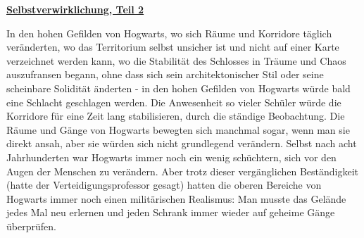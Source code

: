 

\hypertarget{selbstverwirklichung-teil-2}{%

\textbf{\uline{Selbstverwirklichung, Teil 2}}

In den hohen Gefilden von Hogwarts, wo sich Räume und Korridore täglich veränderten, wo das Territorium selbst unsicher ist und nicht auf einer Karte verzeichnet werden kann, wo die Stabilität des Schlosses in Träume und Chaos auszufransen begann, ohne dass sich sein architektonischer Stil oder seine scheinbare Solidität änderten - in den hohen Gefilden von Hogwarts würde bald eine Schlacht geschlagen werden. Die Anwesenheit so vieler Schüler würde die Korridore für eine Zeit lang stabilisieren, durch die ständige Beobachtung. Die Räume und Gänge von Hogwarts bewegten sich manchmal sogar, wenn man sie direkt ansah, aber sie würden sich nicht grundlegend verändern. Selbst nach acht Jahrhunderten war Hogwarts immer noch ein wenig schüchtern, sich vor den Augen der Menschen zu verändern. Aber trotz dieser vergänglichen Beständigkeit (hatte der Verteidigungsprofessor gesagt) hatten die oberen Bereiche von Hogwarts immer noch einen militärischen Realismus: Man musste das Gelände jedes Mal neu erlernen und jeden Schrank immer wieder auf geheime Gänge überprüfen.

}
